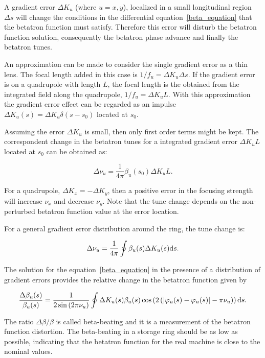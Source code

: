 A gradient error $\Delta K_u$ (where $u=x, y$), localized in a small longitudinal region $\Delta s$ will change the conditions in the differential equation~\eqref{beta_equation} that the betatron function must satisfy. Therefore this error will disturb the betatron function solution, consequently the betatron phase advance and finally the betatron tunes.

An approximation can be made to consider the single gradient error as a thin lens. The focal length added in this case is $1/f_u = \Delta K_u \Delta s$. If the gradient error is on a quadrupole with length $L$, the focal length is the obtained from the integrated field along the quadrupole, $1/f_u = \Delta K_u L$. With this approximation the gradient error effect can be regarded as an impulse $\Delta K_u(s) = \Delta K_u \delta(s-s_0)$ located at $s_0$.

Assuming the error $\Delta K_u$ is small, then only first order terms might be kept. The correspondent change in the betatron tunes for a integrated gradient error $\Delta K_u L$ located at $s_0$ can be obtained as:

\begin{equation}
    \Delta \nu_u = \dfrac{1}{4 \pi} \beta_u (s_0) \Delta K_u L.
\end{equation}

For a quadrupole, $\Delta K_x = - \Delta K_y$, then a positive error in the focusing strength will increase $\nu_x$ and decrease $\nu_y$. Note that the tune change depends on the non-perturbed betatron function value at the error location.

For a general gradient error distribution around the ring, the tune change is:

\begin{equation}
    \Delta \nu_u = \dfrac{1}{4 \pi} \oint \beta_u ({s}) \Delta K_u ({s})\mathrm{d} {s}.
\end{equation}

The solution for the equation~\eqref{beta_equation} in the presence of a distribution of gradient errors provides the relative change in the betatron function given by

\begin{equation}
    \dfrac{\Delta \beta_u(s)}{\beta_u(s)} = \dfrac{1}{2\sin\left(2\pi \nu_u\right)} \oint \Delta K_u(\bar{s}) \beta_u(\bar{s}) \cos\left(2\left(|\varphi_{u}(s) - \varphi_{u}(\bar{s})| - \pi\nu_{u} \right)\right) \mathrm{d} \bar{s}.
\end{equation}

The ratio $\Delta \beta/\beta$ is called beta-beating and it is a measurement of the betatron function distortion. The beta-beating in a storage ring should be as low as possible, indicating that the betatron function for the real machine is close to the nominal values.


